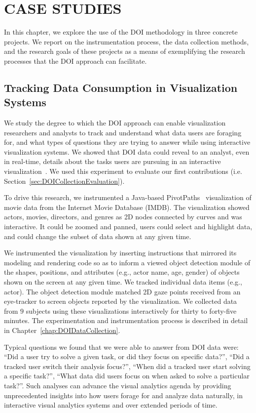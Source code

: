 \chapter{CASE STUDIES}
\label{chap:CaseStudies}

In this chapter, we explore the use of the DOI methodology in three concrete projects. We report on the instrumentation process, the data collection methods, and the research goals of these projects as a means of exemplifying the research processes that the DOI approach can facilitate.  

\section{Tracking Data Consumption in Visualization Systems}
\label{sec:ExperimentIMDB}
We study the degree to which the DOI approach can enable visualization researchers and analysts to track and understand what data users are foraging for, and what types of questions they are trying to answer while using interactive visualization systems. We showed that DOI data could reveal to an analyst, even in real-time, details about the tasks users are pursuing in an interactive visualization~\cite{Ala16, alam2015they}. We used this experiment to evaluate our first contributions (i.e. Section~\ref{sec:DOICollectionEvaluation}). 

To drive this research, we instrumented a Java-based PivotPaths~\cite{Dor12} visualization of movie data from the Internet Movie Database (IMDB). The visualization showed actors, movies, directors, and genres as 2D nodes connected by curves and was interactive. It could be zoomed and panned, users could select and highlight data, and could change the subset of data shown at any given time. 

We instrumented the visualization by inserting instructions that mirrored its modeling and rendering code so as to inform a viewed object detection module of the shapes, positions, and attributes (e.g., actor name, age, gender) of objects shown on the screen at any given time. We tracked individual data items (e.g., actor). The object detection module matched 2D gaze points received from an eye-tracker to screen objects reported by the visualization. We collected data from $9$ subjects using these visualizations interactively for thirty to forty-five minutes. The experimentation and instrumentation process is described in detail in Chapter~\ref{chap:DOIDataCollection}.

Typical questions we found that we were able to answer from DOI data were: ``Did a user try to solve a given task, or did they focus on specific data?'', ``Did a tracked user switch their analysis focus?'', ``When did a tracked user start solving a specific task?'', ``What data did users focus on when asked to solve a particular task?''. Such analyses can advance the visual analytics agenda by providing unprecedented insights into how users forage for and analyze data naturally, in interactive visual analytics systems and over extended periods of time. 

